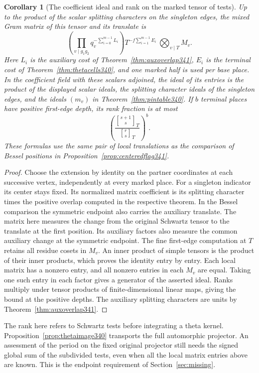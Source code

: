 \documentclass[a4paper,11pt]{article}
\newtheorem{corollary}[proposition]{Corollary}
\theoremstyle{definition}
\theoremstyle{remark}
\numberwithin{equation}{section}
\begin{document}
\begin{corollary}[The coefficient ideal and rank on the marked tensor of tests]\leavevmode\label{cor:markedtests341}
Up to the product of the scalar splitting characters on the singleton
edges, the mixed Gram matrix of this tensor and its translate is
\[
 \left(\prod_{v\mid g_1g_2}q_v^{-\sum_{i=0}^{m-1}L_i}\right)
 T^{-f\sum_{i=1}^{m-1} E_i}\ \bigotimes_{v\mid T}M_v .
\]
Here $L_i$ is the auxiliary cost of Theorem~\ref{thm:auxoverlap341},
$E_i$ is the terminal cost of Theorem~\ref{thm:thetacells340}, and
one marked half is used per base place. In the coefficient field
with these scalars adjoined, the ideal of its entries is the product
of the displayed scalar ideals, the splitting character ideals of
the singleton edges, and the ideals $(m_v)$ in
Theorem~\ref{thm:pintable340}. If $b$ terminal places have positive
first-edge depth, its rank fraction is at most
\[
             \left(\frac{{s+1\brack s}_T}{{r\brack s}_T}\right)^b .
\]
These formulas use the same pair of local translations as the
comparison of Bessel positions in Proposition~\ref{prop:centeredflag341}.
\end{corollary}
\begin{proof}
Choose the extension by identity on the partner coordinates at each
successive vertex, independently at every marked place. For a
singleton indicator its center stays fixed. Its normalized matrix
coefficient is its splitting character times the positive overlap
computed in the respective theorem. In the Bessel comparison the
symmetric endpoint also carries the auxiliary translate. The matrix
here measures the change from the original Schwartz tensor to the
translate at the first position. Its auxiliary factors also measure
the common auxiliary change at the symmetric endpoint. The fine
first-edge computation at $T$ retains all residue cosets in $M_v$.
An inner product of simple tensors is the product of their inner
products, which proves the identity entry by entry. Each local
matrix has a nonzero entry, and all nonzero entries in each $M_v$
are equal. Taking one such entry in each factor gives a generator
of the asserted ideal. Ranks multiply under tensor products of
finite-dimensional linear maps, giving the bound at the positive
depths. The auxiliary splitting characters are units by
Theorem~\ref{thm:auxoverlap341}.
\end{proof}

The rank here refers to Schwartz tests before integrating a theta
kernel. Proposition~\ref{prop:thetaimage340} transports the full
automorphic projector. An assessment of the period on the fixed
original projector still needs the signed global sum of the
subdivided tests, even when all the local matrix entries above are
known. This is the endpoint requirement of Section~\ref{sec:missing}.
\end{document}
